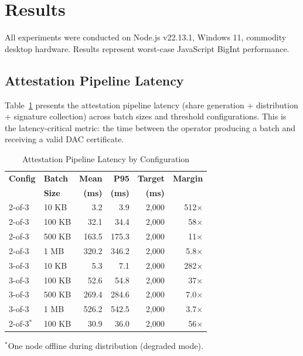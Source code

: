 
\section{Results}

All experiments were conducted on Node.js v22.13.1, Windows 11, commodity
desktop hardware. Results represent worst-case JavaScript BigInt performance.

\subsection{Attestation Pipeline Latency}

Table~\ref{tab:attestation} presents the attestation pipeline latency (share
generation + distribution + signature collection) across batch sizes and
threshold configurations. This is the latency-critical metric: the time
between the operator producing a batch and receiving a valid DAC certificate.

\begin{table}[h]
\centering
\caption{Attestation Pipeline Latency by Configuration}
\label{tab:attestation}
\begin{tabular}{llrrrr}
\toprule
\textbf{Config} & \textbf{Batch} & \textbf{Mean} & \textbf{P95} &
\textbf{Target} & \textbf{Margin} \\
 & \textbf{Size} & \textbf{(ms)} & \textbf{(ms)} & \textbf{(ms)} & \\
\midrule
2-of-3 & 10 KB  & 3.2   & 3.9   & 2,000 & 512$\times$ \\
2-of-3 & 100 KB & 32.1  & 34.4  & 2,000 & 58$\times$ \\
2-of-3 & 500 KB & 163.5 & 175.3 & 2,000 & 11$\times$ \\
2-of-3 & 1 MB   & 320.2 & 346.2 & 2,000 & 5.8$\times$ \\
\midrule
3-of-3 & 10 KB  & 5.3   & 7.1   & 2,000 & 282$\times$ \\
3-of-3 & 100 KB & 52.6  & 54.8  & 2,000 & 37$\times$ \\
3-of-3 & 500 KB & 269.4 & 284.6 & 2,000 & 7.0$\times$ \\
3-of-3 & 1 MB   & 526.2 & 542.5 & 2,000 & 3.7$\times$ \\
\midrule
2-of-3$^*$ & 100 KB & 30.9 & 36.0 & 2,000 & 56$\times$ \\
\bottomrule
\end{tabular}
\begin{flushleft}
\small $^*$One node offline during distribution (degraded mode).
\end{flushleft}
\end{table}

